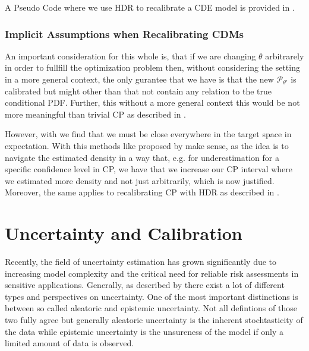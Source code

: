 A Pseudo Code where we use HDR to recalibrate a CDE model is provided in .

\subsubsection{Implicit Assumptions when Recalibrating CDMs}\label{sec:implicit_assumptions_cde}

An important consideration for this whole  is, that if we are changing $\theta$ arbitrarely in order to fullfill the optimization problem then, without considering the setting in a more general context, the only gurantee that we have is that the new $\mathscr{P}_{\theta'}$ is calibrated but might other than that not contain any relation to the true conditional PDF. Further, this without a more general context this would be not more meaningful than trivial CP as described in .

However, with  we find that we must be close everywhere in the target space in expectation. With this methods like proposed by \cite{sesia2021conformal} make sense, as the idea is to navigate the estimated density in a way that, e.g. for underestimation for a specific confidence level in CP, we have that we increase our CP interval where we estimated more density and not just arbitrarily, which is now justified. Moreover, the same applies to recalibrating CP with HDR as described in .

\section{Uncertainty and Calibration}\label{sec:uncertainty_calibration}

Recently, the field of uncertainty estimation has grown significantly due to increasing model complexity and the critical need for reliable risk assessments in sensitive applications. Generally, as described by \cite{hullermeier_aleatoric_2021} there exist a lot of different types and perspectives on uncertainty. One of the most important distinctions is between so called aleatoric and epistemic uncertainty. Not all defintions of those two fully agree but generally aleatoric uncertainty is the inherent stochtasticity of the data while epistemic uncertainty is the unsureness of the model if only a limited amount of data is observed.

